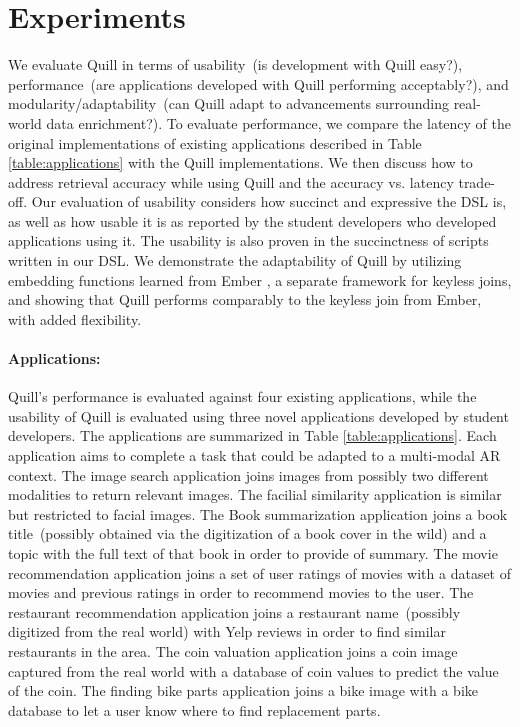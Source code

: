\documentclass[11pt]{article}
\begin{document}
\section{Experiments}
\label{sec:evaluation}
We evaluate Quill in terms of usability~(is development with Quill easy?), performance~(are applications developed with Quill performing acceptably?), and modularity/adaptability~(can Quill adapt to advancements surrounding real-world data enrichment?).
To evaluate performance, we compare the latency of the original implementations of existing applications described in Table \ref{table:applications} with the Quill implementations.
We then discuss how to address retrieval accuracy while using Quill and the accuracy vs. latency trade-off.
Our evaluation of usability considers how succinct and expressive the DSL is, as well as how usable it is as reported by the student developers who developed applications using it.
The usability is also proven in the succinctness of scripts written in our DSL.
We demonstrate the adaptability of Quill by utilizing embedding functions learned from Ember \cite{suri2021ember}, a separate framework for keyless joins, and showing that Quill performs comparably to the keyless join from Ember, with added flexibility.\vspace{0.1cm}

\paragraph{Applications:}
\label{sec:evaluation:apps}
Quill's performance is evaluated against four existing applications, while the usability of Quill is evaluated using three novel applications developed by student developers. The applications are summarized in Table \ref{table:applications}.
Each application aims to complete a task that could be adapted to a multi-modal AR context. The image search application joins images from possibly two different modalities to return relevant images. The facilial similarity application is similar but restricted to facial images.
The Book summarization application joins a book title~(possibly obtained via the digitization of a book cover in the wild) and a topic with the full text of that book in order to provide of summary.
The movie recommendation application joins a set of user ratings of movies with a dataset of movies and previous ratings in order to recommend movies to the user.
The restaurant recommendation application joins a restaurant name~(possibly digitized from the real world) with Yelp reviews in order to find similar restaurants in the area.
The coin valuation application joins a coin image captured from the real world with a database of coin values to predict the value of the coin.
The finding bike parts application joins a bike image with a bike database to let a user know where to find replacement parts.\vspace{0.1cm}
\end{document}
